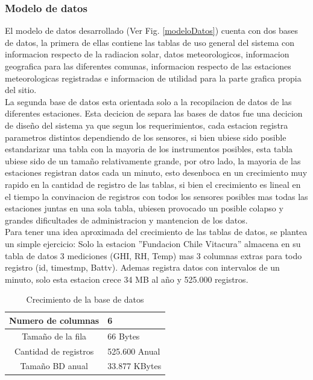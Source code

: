 \subsubsection{Modelo de datos}
El modelo de datos desarrollado (Ver Fig. \ref{modeloDatos}) cuenta con dos bases de datos, la primera de ellas contiene las tablas de uso general del sistema con informacion respecto de la radiacion solar, datos meteorologicos, informacion geografica para las diferentes comunas, informacion respecto de las estaciones meteorologicas registradas e informacion de utilidad para la parte grafica propia del sitio.\\ La segunda base de datos esta orientada solo a la recopilacion de datos de las diferentes estaciones. Esta decicion de separa las bases de datos fue una decicion de diseño del sistema ya que segun los requerimientos, cada estacion registra parametros distintos dependiendo de los sensores, si bien ubiese sido posible estandarizar una tabla con la mayoria de los instrumentos posibles, esta tabla ubiese sido de un tamaño relativamente grande, por otro lado, la mayoria de las estaciones registran datos cada un minuto, esto desenboca en un crecimiento muy rapido en la cantidad de registro de las tablas, si bien el crecimiento es lineal en el tiempo la convinacion de registros con todos los sensores posibles mas todas las estaciones juntas en una sola tabla, ubiesen provocado un posible colapso y grandes dificultades de administracion y mantencion de los datos.\\

Para tener una idea aproximada del crecimiento de las tablas de datos, se plantea un simple ejercicio: Solo la estacion ''Fundacion Chile Vitacura'' almacena en su tabla de datos 3 mediciones (GHI, RH, Temp) mas 3 columnas extras para todo registro (id, timestmp, Battv). Ademas registra datos con intervalos de un minuto, solo esta estacion crece 34 MB al año y 525.000 registros.

\begin{table}[h!]
\caption{Crecimiento de la base de datos}
\begin{tabular}{| c | p{11cm} |}
        \hline
        Numero de columnas & 6\\
        \hline
	Tamaño de la fila & 66 Bytes\\
	\hline
	Cantidad de registros & 525.600 Anual\\
	\hline
	Tamaño BD anual & 33.877 KBytes\\
	\hline
\end{tabular}
\end{table}

